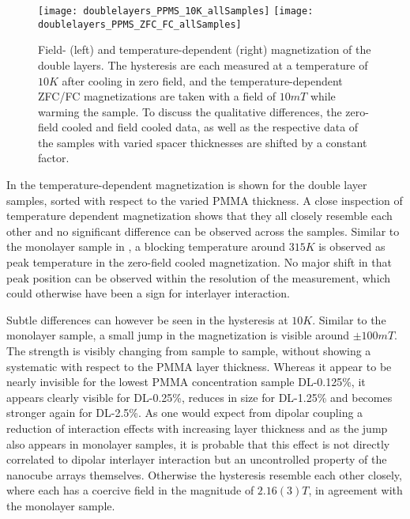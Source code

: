 \documentclass[\main/dresen_thesis.tex]{subfiles}
\begin{document}
  \begin{figure}[tb]
    \centering
    \texttt{[image: doublelayers\_PPMS\_10K\_allSamples]}
    \texttt{[image: doublelayers\_PPMS\_ZFC\_FC\_allSamples]}
    \caption{\label{fig:doubleLayers:zfcFCData}Field- (left) and temperature-dependent (right) magnetization of the double layers. The hysteresis are each measured at a temperature of $10 \unit{K}$ after cooling in zero field, and the temperature-dependent ZFC/FC magnetizations are taken with a field of $10 \unit{mT}$ while warming the sample.  To discuss the qualitative differences, the zero-field cooled and field cooled data, as well as the respective data of the samples with varied spacer thicknesses are shifted by a constant factor.}
  \end{figure}

    In  the temperature-dependent magnetization is shown for the double layer samples, sorted with respect to the varied PMMA thickness.
    A close inspection of temperature dependent magnetization shows that they all closely resemble each other and no significant difference can be observed across the samples.
    Similar to the monolayer sample in , a blocking temperature around $315 \unit{K}$ is observed as peak temperature in the zero-field cooled magnetization.
    No major shift in that peak position can be observed within the resolution of the measurement, which could otherwise have been a sign for interlayer interaction.

    Subtle differences can however be seen in the hysteresis at $10 \unit{K}$.
    Similar to the monolayer sample, a small jump in the magnetization is visible around $\pm 100 \unit{mT}$.
    The strength is visibly changing from sample to sample, without showing a systematic with respect to the PMMA layer thickness.
    Whereas it appear to be nearly invisible for the lowest PMMA concentration sample DL-0.125\%, it appears clearly visible for DL-0.25\%, reduces in size for DL-1.25\% and becomes stronger again for DL-2.5\%.
    As one would expect from dipolar coupling a reduction of interaction effects with increasing layer thickness and as the jump also appears in monolayer samples, it is probable that this effect is not directly correlated to dipolar interlayer interaction but an uncontrolled property of the nanocube arrays themselves.
    Otherwise the hysteresis resemble each other closely, where each has a coercive field in the magnitude of $2.16(3) \unit{T}$, in agreement with the monolayer sample.
\end{document}
